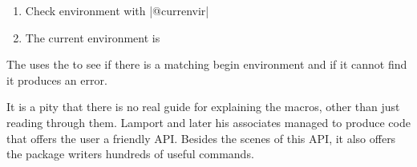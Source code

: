 \begin{enumerate}
\item Check environment with |@currenvir|
\makeatletter
 \item The current environment is \@currenvir
\makeatother
\end{enumerate}

The   uses the  to see if there is a matching
begin environment and if it cannot find it produces an error.

\begin{teX}
\def\@checkend#1{%
   \def\reserved@a{#1}
   \ifx\reserved@a\@currenvir 
   \else
     \@badend{#1}
   \fi
}
\end{teX}

It is a pity that there is no real guide for explaining the \latex macros, other than just reading through them. Lamport and later his associates managed to produce code that offers the user a friendly API. Besides the scenes of this API, it also offers the package writers hundreds of useful commands.





